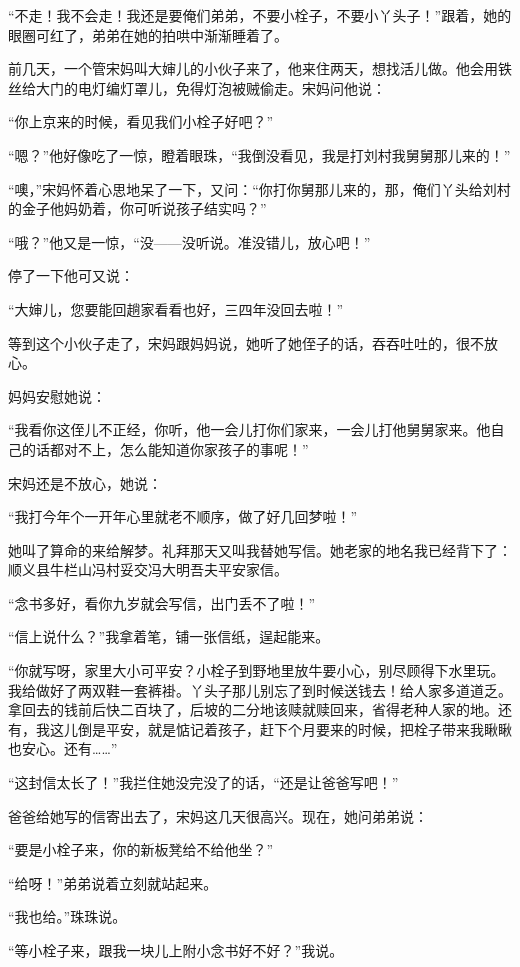 \par “不走！我不会走！我还是要俺们弟弟，不要小栓子，不要小丫头子！”跟着，她的眼圈可红了，弟弟在她的拍哄中渐渐睡着了。
\par 前几天，一个管宋妈叫大婶儿的小伙子来了，他来住两天，想找活儿做。他会用铁丝给大门的电灯编灯罩儿，免得灯泡被贼偷走。宋妈问他说：
\par “你上京来的时候，看见我们小栓子好吧？”
\par “嗯？”他好像吃了一惊，瞪着眼珠，“我倒没看见，我是打刘村我舅舅那儿来的！”
\par “噢，”宋妈怀着心思地呆了一下，又问：“你打你舅那儿来的，那，俺们丫头给刘村的金子他妈奶着，你可听说孩子结实吗？”
\par “哦？”他又是一惊，“没——没听说。准没错儿，放心吧！”
\par 停了一下他可又说：
\par “大婶儿，您要能回趟家看看也好，三四年没回去啦！”
\par 等到这个小伙子走了，宋妈跟妈妈说，她听了她侄子的话，吞吞吐吐的，很不放心。
\par 妈妈安慰她说：
\par “我看你这侄儿不正经，你听，他一会儿打你们家来，一会儿打他舅舅家来。他自己的话都对不上，怎么能知道你家孩子的事呢！”
\par 宋妈还是不放心，她说：
\par “我打今年个一开年心里就老不顺序，做了好几回梦啦！”
\par 她叫了算命的来给解梦。礼拜那天又叫我替她写信。她老家的地名我已经背下了：顺义县牛栏山冯村妥交冯大明吾夫平安家信。
\par “念书多好，看你九岁就会写信，出门丢不了啦！”
\par “信上说什么？”我拿着笔，铺一张信纸，逞起能来。
\par “你就写呀，家里大小可平安？小栓子到野地里放牛要小心，别尽顾得下水里玩。我给做好了两双鞋一套裤褂。丫头子那儿别忘了到时候送钱去！给人家多道道乏。拿回去的钱前后快二百块了，后坡的二分地该赎就赎回来，省得老种人家的地。还有，我这儿倒是平安，就是惦记着孩子，赶下个月要来的时候，把栓子带来我瞅瞅也安心。还有……”
\par “这封信太长了！”我拦住她没完没了的话，“还是让爸爸写吧！”
\par 爸爸给她写的信寄出去了，宋妈这几天很高兴。现在，她问弟弟说：
\par “要是小栓子来，你的新板凳给不给他坐？”
\par “给呀！”弟弟说着立刻就站起来。
\par “我也给。”珠珠说。
\par “等小栓子来，跟我一块儿上附小念书好不好？”我说。
